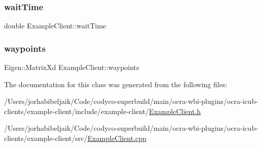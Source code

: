 \hypertarget{classExampleClient_acade7035d4e39290cbda08b98249a629}{}\label{classExampleClient_acade7035d4e39290cbda08b98249a629} 
\subsubsection{\texorpdfstring{wait\+Time}{waitTime}}
{\footnotesize\ttfamily double Example\+Client\+::wait\+Time\hspace{0.3cm}{\ttfamily [private]}}

\hypertarget{classExampleClient_acf4657277ecb08168d9a17c208814823}{}\label{classExampleClient_acf4657277ecb08168d9a17c208814823} 
\subsubsection{\texorpdfstring{waypoints}{waypoints}}
{\footnotesize\ttfamily Eigen\+::\+Matrix\+Xd Example\+Client\+::waypoints\hspace{0.3cm}{\ttfamily [private]}}



The documentation for this class was generated from the following files\+:\begin{DoxyCompactItemize}
\item 
/\+Users/jorhabibeljaik/\+Code/codyco-\/superbuild/main/ocra-\/wbi-\/plugins/ocra-\/icub-\/clients/example-\/client/include/example-\/client/\hyperlink{ExampleClient_8h}{Example\+Client.\+h}\item 
/\+Users/jorhabibeljaik/\+Code/codyco-\/superbuild/main/ocra-\/wbi-\/plugins/ocra-\/icub-\/clients/example-\/client/src/\hyperlink{ExampleClient_8cpp}{Example\+Client.\+cpp}\end{DoxyCompactItemize}
